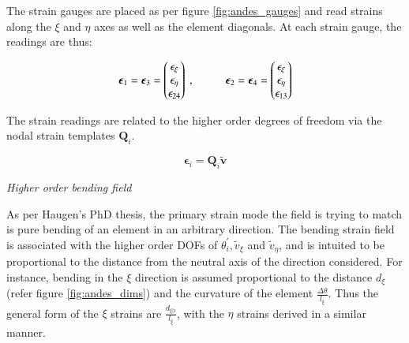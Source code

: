The strain gauges are placed as per figure \ref{fig:andes_gauges} and read strains along the $\xi$ and $\eta$ axes as well as the element diagonals. At each strain gauge, the readings are thus:

\begin{equation} 
\boldsymbol{\epsilon}_{1} = \boldsymbol{\epsilon}_{3} =
\begin{pmatrix}
\epsilon_\xi \\
\epsilon_\eta \\
\epsilon_{24}
\end{pmatrix}
\ ,
\hspace{10mm}
\boldsymbol{\epsilon}_{2} = \boldsymbol{\epsilon}_{4} =
\begin{pmatrix}
\epsilon_\xi \\
\epsilon_\eta \\
\epsilon_{13}
\end{pmatrix}
\label{eqnAndesStrainGauges}
\end{equation}

The strain readings are related to the higher order degrees of freedom via the nodal strain templates $\mathbf{Q}_i$.

\begin{equation} 
\boldsymbol{\epsilon}_{i} = \mathbf{Q}_i \widetilde{\mathbf{v}}
\label{eqnAndesHigherOrderStrains}
\end{equation}

\textit{Higher order bending field}

As per Haugen's PhD thesis, the primary strain mode the field is trying to match is pure bending of an element in an arbitrary direction. The bending strain field is associated with the higher order DOFs of $\theta_i^{'}, \widetilde{v}_{\xi}$ and $\widetilde{v}_{\eta}$, and is intuited to be proportional to the distance from the neutral axis of the direction considered. For instance, bending in the $\xi$ direction is assumed proportional to the distance $d_{\xi}$ (refer figure \ref{fig:andes_dims}) and the curvature of the element $\frac{\Delta \theta}{l_{\xi}}$. Thus the general form of the $\xi$ strains are $\frac{d_{\xi | i}}{l_\xi}$, with the $\eta$ strains derived in a similar manner.

